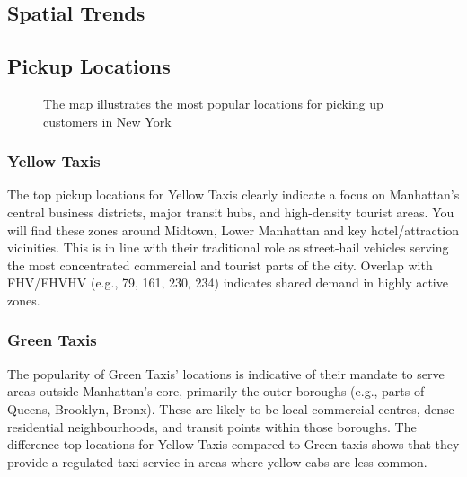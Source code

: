 \documentclass[conference]{IEEEtran}
\begin{document}
\subsection{Spatial Trends}

\subsection{Pickup Locations}

\begin{figure}[htbp]
  \label{fig:most-popular-pickup-locations}
  \centering
  
  \caption{The map illustrates the most popular locations for picking up customers in New York}
\end{figure}

\subsubsection*{Yellow Taxis}
The top pickup locations for Yellow Taxis clearly indicate a focus on Manhattan's central business districts, major
transit hubs, and high-density tourist areas. You will find these zones around Midtown, Lower Manhattan and key
hotel/attraction vicinities. This is in line with their traditional role as street-hail vehicles serving the most
concentrated commercial and tourist parts of the city. Overlap with FHV/FHVHV (e.g., 79, 161, 230, 234) indicates shared
demand in highly active zones.

\subsubsection*{Green Taxis} The popularity of Green Taxis' locations is indicative of their mandate to serve areas
outside Manhattan's core,
primarily the outer boroughs (e.g., parts of Queens, Brooklyn, Bronx). These are likely to be local commercial centres,
dense residential neighbourhoods, and transit points within those boroughs. The difference top locations
for Yellow Taxis compared to Green taxis shows that they provide a regulated taxi service in areas where yellow
cabs are less common.
\end{document}
